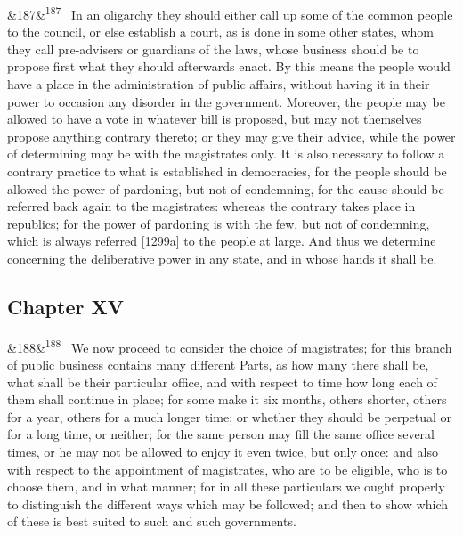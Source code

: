 \documentclass[12pt]{article}
\newcommand{\para}[1][]{\par\noindent\ifx&#1&\else\textsuperscript{\footnotesize #1}~\fi}
\begin{document}
\para[187] In an oligarchy they should either call up some of the common people to the council, or else establish a court, as is done in some other states, whom they call pre-advisers or guardians of the laws, whose business should be to propose first what they should afterwards enact. By this means the people would have a place in the administration of public affairs, without having it in their power to occasion any disorder in the government. Moreover, the people may be allowed to have a vote in whatever bill is proposed, but may not themselves propose anything contrary thereto; or they may give their advice, while the power of determining may be with the magistrates only. It is also necessary to follow a contrary practice to what is established in democracies, for the people should be allowed the power of pardoning, but not of condemning, for the cause should be referred back again to the magistrates: whereas the contrary takes place in republics; for the power of pardoning is with the few, but not of condemning, which is always referred [1299a] to the people at large. And thus we determine concerning the deliberative power in any state, and in whose hands it shall be.

\subsection*{Chapter XV}

\para[188] We now proceed to consider the choice of magistrates; for this branch of public business contains many different Parts, as how many there shall be, what shall be their particular office, and with respect to time how long each of them shall continue in place; for some make it six months, others shorter, others for a year, others for a much longer time; or whether they should be perpetual or for a long time, or neither; for the same person may fill the same office several times, or he may not be allowed to enjoy it even twice, but only once: and also with respect to the appointment of magistrates, who are to be eligible, who is to choose them, and in what manner; for in all these particulars we ought properly to distinguish the different ways which may be followed; and then to show which of these is best suited to such and such governments.
\end{document}
